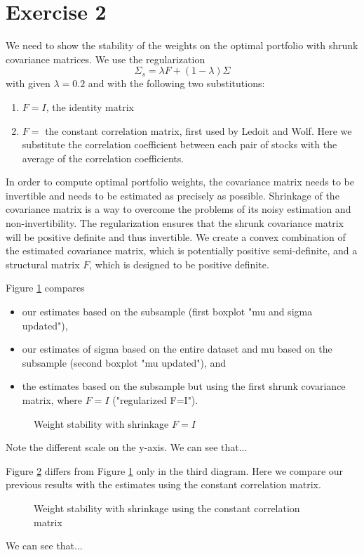 \section*{Exercise 2}

We need to show the stability of the weights on the optimal portfolio with shrunk covariance matrices. We use the regularization 
\begin{equation*}
\Sigma_s = \lambda F + (1-\lambda)\Sigma
\end{equation*}
with given $\lambda=0.2$ and with the following two substitutions:
\begin{enumerate}
\item $F=I$, the identity matrix 
\item $F =$ the constant correlation matrix, first used by Ledoit and Wolf. Here we substitute the correlation coefficient between each pair of stocks with the average of the correlation coefficients.  
\end{enumerate} 


In order to compute optimal portfolio weights, the covariance matrix needs to be invertible and needs to be estimated as precisely as possible. 
Shrinkage of the covariance matrix is a way to overcome the problems of its noisy estimation and non-invertibility.
The regularization ensures that the shrunk covariance matrix will be positive definite and thus invertible. We create a convex combination of the estimated covariance matrix, which is potentially positive semi-definite, and a structural matrix $F$, which is designed to be positive definite.

Figure \ref{fig2} compares  
\begin{itemize}
\item our estimates based on the subsample (first boxplot "mu and sigma updated"),
\item our estimates of sigma based on the entire dataset and mu based on the subsample (second boxplot "mu updated"), and
\item the estimates based on the subsample but using the first shrunk covariance matrix, where $F=I$ ("regularized F=I"). 
\end{itemize}

\begin{figure}[H]
\caption{Weight stability with shrinkage $F=I$}
\label{fig2}
\end{figure}

Note the different scale on the y-axis. We can see that...

 
Figure \ref{fig3} differs from Figure \ref{fig2} only in the third diagram. Here we compare our previous results with the estimates using the constant correlation matrix.
\begin{figure}[H]
\caption{Weight stability with shrinkage using the constant correlation matrix}
\label{fig3}
\end{figure}

We can see that...
